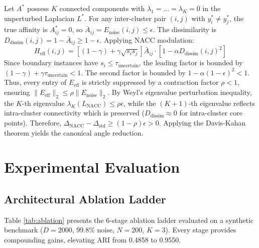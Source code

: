 \documentclass[journal]{IEEEtran}
\begin{document}
\begin{IEEEproof}
Let $A^*$ possess $K$ connected components with $\lambda_1 = \dots = \lambda_K = 0$ in the unperturbed Laplacian $L^*$. For any inter-cluster pair $(i, j)$ with $y_i^* \neq y_j^*$, the true affinity is $A_{ij}^* = 0$, so $\bar{A}_{ij} = E_{\text{noise}}(i, j) \le \epsilon$. The dissimilarity is $D_{\text{dissim}}(i, j) = 1 - \bar{A}_{ij} \ge 1 - \epsilon$. Applying NACC modulation:
\begin{equation}
H_{\text{eff}}(i, j) = \left[(1 - \gamma) + \gamma \sqrt{s_i s_j}\right] \bar{A}_{ij} \cdot \left[1 - \alpha D_{\text{dissim}}(i, j)^2\right]
\end{equation}
Since boundary instances have $s_i \le \tau_{\text{uncertain}}$, the leading factor is bounded by $(1 - \gamma) + \gamma \tau_{\text{uncertain}} < 1$. The second factor is bounded by $1 - \alpha (1 - \epsilon)^2 < 1$. Thus, every entry of $E_{\text{eff}}$ is strictly suppressed by a contraction factor $\rho < 1$, ensuring $\|E_{\text{eff}}\|_2 \le \rho \|E_{\text{noise}}\|_2$. By Weyl's eigenvalue perturbation inequality, the $K$-th eigenvalue $\lambda_K(L_{\text{NACC}}) \le \rho \epsilon$, while the $(K+1)$-th eigenvalue reflects intra-cluster connectivity which is preserved ($D_{\text{dissim}} \approx 0$ for intra-cluster core points). Therefore, $\Delta_{\text{NACC}} - \Delta_{\text{std}} \ge (1 - \rho) \epsilon > 0$. Applying the Davis-Kahan theorem yields the canonical angle reduction.
\end{IEEEproof}

\section{Experimental Evaluation}

\subsection{Architectural Ablation Ladder}
Table \ref{tab:ablation} presents the 6-stage ablation ladder evaluated on a synthetic benchmark ($D=2000$, 99.8\% noise, $N=200$, $K=3$). Every stage provides compounding gains, elevating ARI from 0.4858 to 0.9550.
\end{document}
